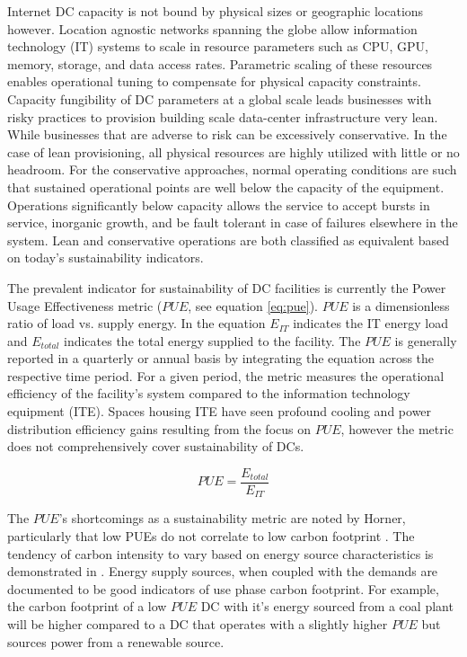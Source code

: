 Internet DC capacity is not bound by physical sizes or geographic locations however. Location agnostic networks spanning the globe allow information technology (IT) systems to scale in resource parameters such as CPU, GPU, memory, storage, and data access rates. Parametric scaling of these resources enables operational tuning to compensate for physical capacity constraints. Capacity fungibility of DC parameters at a global scale leads businesses with risky practices to provision building scale data-center infrastructure very lean. While businesses that are adverse to risk can be excessively conservative. In the case of lean provisioning, all physical resources are highly utilized with little or no headroom. For the conservative approaches, normal operating conditions are such that sustained operational points are well below the capacity of the equipment. Operations significantly below capacity allows the service to accept bursts in service, inorganic  growth, and be fault tolerant in case of failures elsewhere in the system. Lean and conservative operations are both classified as equivalent based on today's sustainability indicators.

The prevalent indicator for sustainability of DC facilities is currently the Power Usage Effectiveness metric ($PUE$, see equation \ref{eq:pue}). $PUE$ is a dimensionless ratio of load vs. supply energy.   In the equation $E_{IT}$ indicates the IT energy load and $E_{total}$ indicates the total energy supplied to the facility. The $PUE$ is generally reported in a quarterly or annual basis by integrating the equation across the respective time period. For a given period, the metric measures the operational efficiency of the facility's system compared to the information technology equipment (ITE). Spaces housing ITE have seen profound cooling and power distribution efficiency gains resulting from the focus on $PUE$, however the metric does not comprehensively cover sustainability of DCs.

\begin{equation} \label{eq:pue}
PUE=\frac{E_{total}}{E_{IT}} 
\end{equation}

The $PUE$'s shortcomings as a sustainability metric are noted by Horner, particularly that low PUEs do not correlate to low carbon footprint \citep{Horner16}. The tendency of carbon intensity to vary based on energy source characteristics is demonstrated in \citep{Masanet13a}. Energy supply sources, when coupled with the demands are documented to be good indicators of use phase carbon footprint. For example, the carbon footprint of a low $PUE$ DC with it's energy sourced from a coal plant will be higher compared to a DC that operates with a slightly higher $PUE$ but sources power from a renewable source. 

